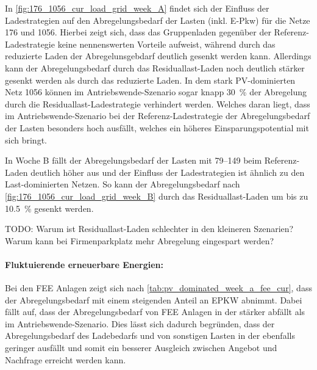 In \autoref{fig:176_1056_cur_load_grid_week_A} findet sich der Einfluss der Ladestrategien auf den Abregelungsbedarf der Lasten (inkl. E-Pkw) für die Netze \num{176} und \num{1056}.
Hierbei zeigt sich, dass das Gruppenladen gegenüber der Referenz-Ladestrategie keine nennenswerten Vorteile aufweist, während durch das reduzierte Laden der Abregelunsgebdarf deutlich gesenkt werden kann.
Allerdings kann der Abregelungsbedarf durch das Residuallast-Laden noch deutlich stärker gesenkt werden als durch das reduzierte Laden.
In dem stark \gls{PV}-dominierten Netz \num{1056} können im Antriebswende-Szenario sogar knapp \SI{30}{\percent} der Abregelung durch die Residuallast-Ladestrategie verhindert werden.
Welches daran liegt, dass im Antriebswende-Szenario bei der Referenz-Ladestrategie der Abregelungsbedarf der Lasten besonders hoch ausfällt, welches ein höheres Einsparungspotential mit sich bringt.



In Woche B fällt der Abregelungsbedarf der Lasten mit \SIrange{79}{149}{\mwh} beim Referenz-Laden deutlich höher aus und der Einfluss der Ladestrategien ist ähnlich zu den Last-dominierten Netzen.
So kann der Abregelungsbedarf nach \autoref{fig:176_1056_cur_load_grid_week_B} durch das Residuallast-Laden um bis zu \SI{10.5}{\percent} gesenkt werden.

{\color{red} TODO: Warum ist Residuallast-Laden schlechter in den kleineren Szenarien? Warum kann bei Firmenparkplatz mehr Abregelung eingespart werden?}




\paragraph{Fluktuierende erneuerbare Energien:}

Bei den \gls{FEE} Anlagen zeigt sich nach \autoref{tab:pv_dominated_week_a_fee_cur}, dass der Abregelungsbedarf mit einem steigenden Anteil an \gls{EPKW} abnimmt.
Dabei fällt auf, dass der Abregelungsbedarf von \gls{FEE} Anlagen in der \SzeFirmenparkplatz stärker abfällt als im Antriebswende-Szenario.
Dies lässt sich dadurch begründen, dass der Abregelungsbedarf des Ladebedarfs und von sonstigen Lasten in der \SzeFirmenparkplatz ebenfalls geringer ausfällt und somit ein besserer Ausgleich zwischen Angebot und Nachfrage erreicht werden kann.



